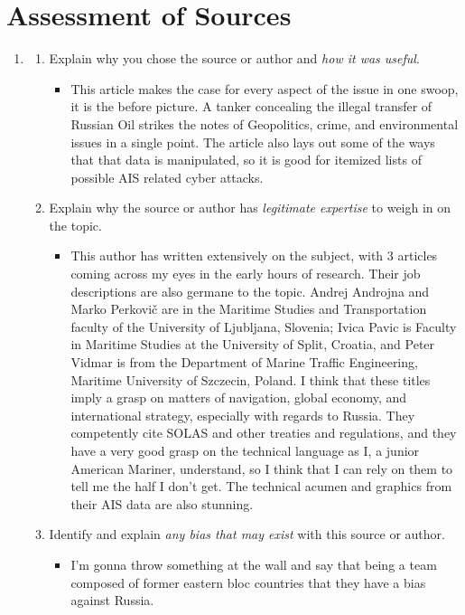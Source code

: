 \documentclass[12pt]{texMemo} %
\begin{document}
\section*{Assessment of Sources}
\begin{enumerate}
    \item {}
    \begin{enumerate}
    \item Explain why you chose the source or author and \emph{how it was useful}.
        \begin{itemize}
            \item This article makes the case for every aspect of the issue in one swoop, it is the before picture. A tanker concealing the illegal transfer of Russian Oil strikes the notes of Geopolitics, crime, and environmental issues in a single point. The article also lays out some of the ways that that data is manipulated, so it is good for itemized lists of possible AIS related cyber attacks.
        \end{itemize}
    \item Explain why the source or author has \emph{legitimate expertise} to weigh in on the topic.
        \begin{itemize}
            \item This author has written extensively on the subject, with 3 articles coming across my eyes in the early hours of research. Their job descriptions are also germane to the topic. Andrej Androjna and Marko Perkovič are in the Maritime Studies and Transportation faculty of the University of Ljubljana, Slovenia; Ivica Pavic is Faculty in Maritime Studies at the University of Split, Croatia, and Peter Vidmar is from the Department of Marine Traffic Engineering, Maritime University of Szczecin, Poland. I think that these titles imply a grasp on matters of navigation, global economy, and international strategy, especially with regards to Russia. They competently cite SOLAS and other treaties and regulations, and they have a very good grasp on the technical language as I, a junior American Mariner, understand, so I think that I can rely on them to tell me the half I don't get. The technical acumen and graphics from their AIS data are also stunning.
        \end{itemize}
    \item Identify and explain \emph{any bias that may exist} with this source or author.
        \begin{itemize}
            \item I'm gonna throw something at the wall and say that being a team composed of former eastern bloc countries that they have a bias against Russia. 

\end{itemize}
\end{enumerate}
\end{enumerate}
\end{document}
